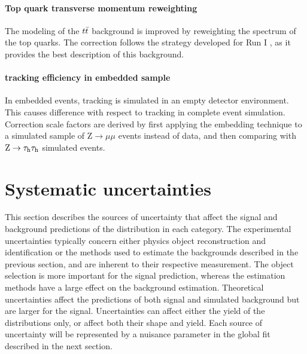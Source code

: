 \paragraph{Top quark transverse momentum reweighting} The modeling of the $t\Bar{t}$ background is improved by reweighting the \pt spectrum of the top quarks. The correction follows the strategy developed for Run I \cite{Khachatryan:2015oqa}, as it provides the best description of this background.



\paragraph{\tauh tracking efficiency in embedded sample} In embedded events, tracking is simulated in an empty detector environment. This causes difference with respect to tracking in complete event simulation. Correction scale factors are derived by first applying the embedding technique to a simulated sample of $\mathrm{Z}\rightarrow \mu\mu$ events instead of data, and then comparing with $\mathrm{Z}\rightarrow \tau_{\rm h}\tau_{\rm h}$ simulated events.

\section{Systematic uncertainties}
\label{sec:analysis_systematics}

This section describes the sources of uncertainty that affect the signal and background predictions of the \mttot distribution in each category. The experimental uncertainties typically concern either physics object reconstruction and identification or the methods used to estimate the backgrounds described in the previous section, and are inherent to their respective measurement. The object selection is more important for the signal prediction, whereas the estimation methods have a large effect on the background estimation. Theoretical uncertainties affect the predictions of both signal and simulated background but are larger for the signal. Uncertainties can affect either the yield of the distributions only, or affect both their shape and yield. Each source of uncertainty will be represented by a nuisance parameter in the global fit described in the next section.

